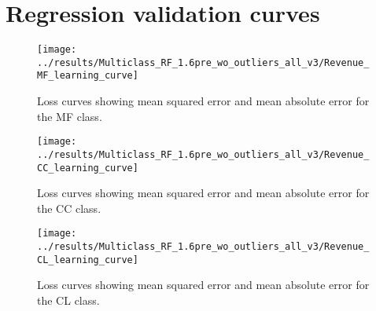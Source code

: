 \documentclass[14pt]{scrartcl}
\begin{document}
\section{Regression validation curves}\label{app:regression}
\begin{figure}[htpb!]
    \texttt{[image: ../results/Multiclass\_RF\_1.6pre\_wo\_outliers\_all\_v3/Revenue\_MF\_learning\_curve]}\\
    \caption{Loss curves showing mean squared error and mean absolute error for the
             MF class.}
    \label{fig:lc_MF}
\end{figure}
\begin{figure}[htpb!]
    \texttt{[image: ../results/Multiclass\_RF\_1.6pre\_wo\_outliers\_all\_v3/Revenue\_CC\_learning\_curve]}\\
    \caption{Loss curves showing mean squared error and mean absolute error for the
             CC class.}
    \label{fig:lc_cc}
\end{figure}
\begin{figure}[htpb!]
    \texttt{[image: ../results/Multiclass\_RF\_1.6pre\_wo\_outliers\_all\_v3/Revenue\_CL\_learning\_curve]}\\
    \caption{Loss curves showing mean squared error and mean absolute error for the
             CL class.}
    \label{fig:lc_cl}
\end{figure}
\end{document}
